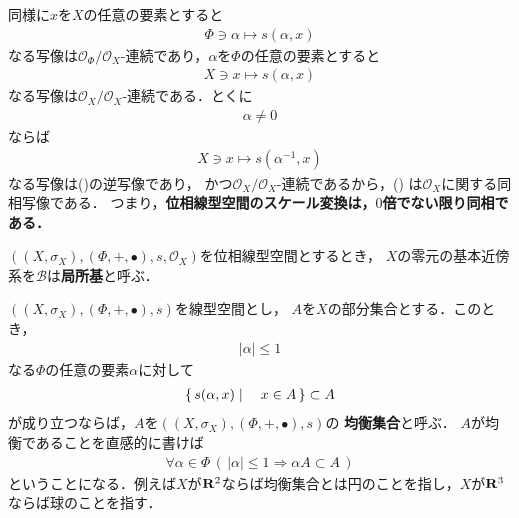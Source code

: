 	同様に$x$を$X$の任意の要素とすると
	\begin{align}
		\Phi \ni \alpha \longmapsto s(\alpha,x)
	\end{align}
	なる写像は$\mathscr{O}_\Phi/\mathscr{O}_X$-連続であり，$\alpha$を$\Phi$の任意の要素とすると
	\begin{align}
		X \ni x \longmapsto s(\alpha,x)
		\label{partial_continuity_of_summation_of_topological_vector_spaces_1}
	\end{align}
	なる写像は$\mathscr{O}_X/\mathscr{O}_X$-連続である．とくに
	\begin{align}
		\alpha \neq 0
	\end{align}
	ならば
	\begin{align}
		X \ni x \longmapsto s(\alpha^{-1},x)
	\end{align}
	なる写像は()の逆写像であり，
	かつ$\mathscr{O}_X/\mathscr{O}_X$-連続であるから，()
	は$\mathscr{O}_X$に関する同相写像である．
	つまり，{\bf 位相線型空間のスケール変換は，$0$倍でない限り同相である．}
	
	\begin{screen}
		\begin{dfn}[局所基]
			$\left(\left(X,\sigma_X\right),(\Phi,+,\bullet),s,\mathscr{O}_X\right)$を位相線型空間とするとき，
			$X$の零元の基本近傍系を$\mathscr{B}$は{\bf 局所基}と呼ぶ．
		\end{dfn}
	\end{screen}
	
	$\left(\left(X,\sigma_X\right),(\Phi,+,\bullet),s\right)$を線型空間とし，
	$A$を$X$の部分集合とする．このとき，
	\begin{align}
		|\alpha| \leq 1
	\end{align}
	なる$\Phi$の任意の要素$\alpha$に対して
	\begin{align}
		\left\{\, s(\alpha,x) \mid \quad x \in A\, \right\} \subset A
	\end{align}
	が成り立つならば，$A$を$\left(\left(X,\sigma_X\right),(\Phi,+,\bullet),s\right)$の
	{\bf 均衡集合}と呼ぶ．
	$A$が均衡であることを直感的に書けば
	\begin{align}
		\forall \alpha \in \Phi\,
		\left(\, |\alpha| \leq 1 \Longrightarrow \alpha A \subset A\, \right)
	\end{align}
	ということになる．例えば$X$が$\mathbf{R}^2$ならば均衡集合とは円のことを指し，$X$が$\mathbf{R}^3$ならば球のことを指す．
	
